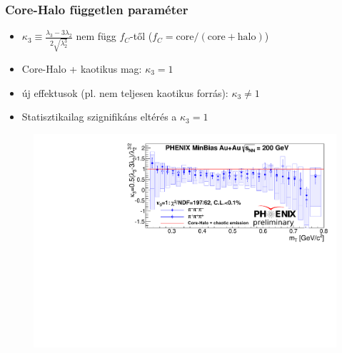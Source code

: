 \documentclass{beamer}
\begin{document}
\begin{frame}
\frametitle{Core-Halo független paraméter}
\begin{itemize}
\item $\kappa_3\equiv\frac{\lambda_3-3\lambda_2}{2\sqrt{\lambda_2^3}}$ nem függ $f_C$-től ($f_C=\mathrm{core}/(\mathrm{core}+\mathrm{halo})$)
\item Core-Halo + kaotikus mag: $\kappa_3=1$
\item új effektusok (pl. nem teljesen kaotikus forrás): $\kappa_3\neq 1$
\item Statisztikailag szignifikáns eltérés a $\kappa_3=1$
\end{itemize}
\begin{figure}
\includegraphics[scale=0.5]{pic/kappa3}
\end{figure}
\end{frame}
\end{document}
